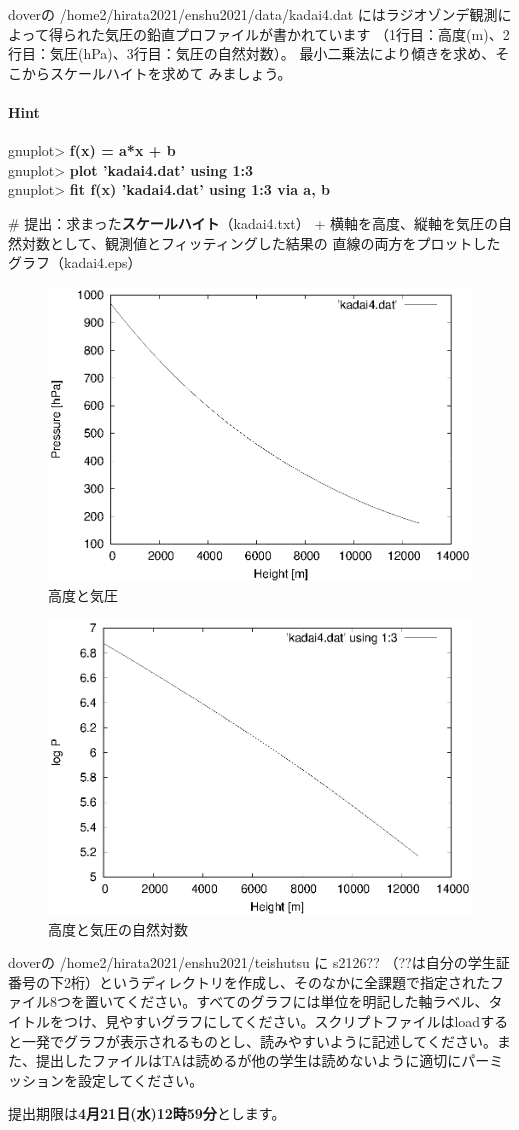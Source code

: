 \documentclass[a4j]{ujarticle} %
\newenvironment{terminal}{%
  \begin{center}
   \begin{minipage}{.8\textwidth}
    \setlength{\FrameSep}{.5\FrameSep}%
    \begin{framed}\ttfamily\small%
     \setlength\baselineskip{.85\baselineskip}%
}{%
    \end{framed}
   \end{minipage}
  \end{center}%
}
\begin{document}
\begin{enumerate}
doverの /home2/hirata2021/enshu2021/data/kadai4.dat にはラジオゾンデ観測によって得られた気圧の鉛直プロファイルが書かれています
（1行目：高度(m)、2行目：気圧(hPa)、3行目：気圧の自然対数）。
最小二乗法により傾きを求め、そこからスケールハイトを求めて
みましょう。

\paragraph{Hint}

\begin{terminal}
 gnuplot> {\bf f(x) = a*x + b} \\  
 gnuplot> {\bf plot 'kadai4.dat' using 1:3} \\
 gnuplot> {\bf fit f(x) 'kadai4.dat' using 1:3 via a, b}
\end{terminal}

\# 提出：求まった\textbf{スケールハイト}（kadai4.txt）
     + 横軸を高度、縦軸を気圧の自然対数として、観測値とフィッティングした結果の
     直線の両方をプロットしたグラフ（kadai4.eps）

\newpage
\begin{figure}[h]
 \begin{center}
  \includegraphics[width=0.6\hsize]{kadai4-1.eps}
  \caption{高度と気圧}
 \end{center}
\end{figure}

\begin{figure}[h]
 \begin{center}
  \includegraphics[width=0.6\hsize]{kadai4-2.eps}
  \caption{高度と気圧の自然対数}
 \end{center}
\end{figure}

\end{enumerate}
doverの /home2/hirata2021/enshu2021/teishutsu に s2126?? （??は自分の学生証番号の下2桁）というディレクトリを作成し、そのなかに全課題で指定されたファイル8つを置いてください。すべてのグラフには単位を明記した軸ラベル、タイトルをつけ、見やすいグラフにしてください。スクリプトファイルはloadすると一発でグラフが表示されるものとし、読みやすいように記述してください。また、提出したファイルはTAは読めるが他の学生は読めないように適切にパーミッションを設定してください。

提出期限は\textbf{4月21日(水)12時59分}とします。
\end{document}
